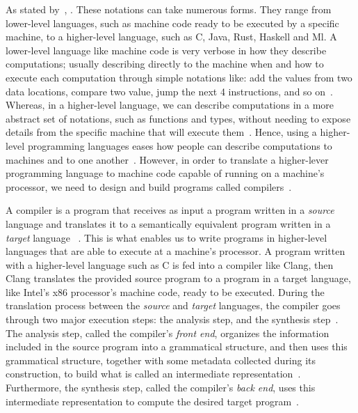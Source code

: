 \documentclass[
    oneside,
    english,
    embeddedlogo,
    noabntexcite
]{ufsc-thesis-rn46-2019}
\begin{document}
As stated by~\textcite{Aho:2006:CPT:1177220}, .
These notations can take numerous forms.
They range from lower-level languages, such as machine code ready to be executed by a specific machine, to a higher-level language, such as C, Java, Rust, Haskell and Ml.
A lower-level language like machine code is very verbose in how they describe computations; usually describing directly to the machine when and how to execute each computation through simple notations like: add the values from two data locations, compare two value, jump the next 4 instructions, and so on~\cite{Aho:2006:CPT:1177220}.
Whereas, in a higher-level language, we can describe computations in a more abstract set of notations, such as functions and types, without needing to expose details from the specific machine that will execute them~\cite{Aho:2006:CPT:1177220}.
Hence, using a higher-level programming languages eases how people can describe computations to machines and to one another~\cite{Aho:2006:CPT:1177220}.
However, in order to translate a higher-lever programming language to machine code capable of running on a machine's processor, we need to design and build programs called compilers~\cite{Aho:2006:CPT:1177220}.

A compiler is a program that receives as input a program written in a \textit{source} language and translates it to a semantically equivalent program written in a \textit{target} language
~\cite{Aho:2006:CPT:1177220}.
This is what enables us to write programs in higher-level languages that are able to execute at a machine's processor.
A program written with a higher-level language such as C is fed into a compiler like Clang, then Clang translates the provided source program to a program in a target language, like Intel's x86 processor's machine code, ready to be executed.
During the translation process between the \textit{source} and \textit{target} languages, the compiler goes through two major execution steps: the analysis step, and the synthesis step~\cite{Aho:2006:CPT:1177220}.
The analysis step, called the compiler's \textit{front end}, organizes the information included in the source program into a grammatical structure, and then uses this grammatical structure, together with some metadata collected during its construction, to build what is called an intermediate representation~\cite{Aho:2006:CPT:1177220}.
Furthermore, the synthesis step, called the compiler's \textit{back end}, uses this intermediate representation to compute the desired target program~\cite{Aho:2006:CPT:1177220}.
\end{document}

